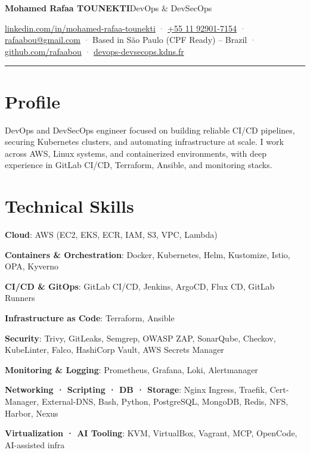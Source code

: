 \documentclass[10pt,a4paper]{article}
\begin{document}
{\LARGE\bfseries Mohamed Rafaa TOUNEKTI}\hfill{\small DevOps \& DevSecOps}\par
\vspace{3pt}
{\footnotesize \href{https://linkedin.com/in/mohamed-rafaa-tounekti}{linkedin.com/in/mohamed-rafaa-tounekti} \textcolor{graytext}{·} \href{tel:+5511929017154}{+55 11 92901-7154} \textcolor{graytext}{·} \href{mailto:rafaabou@gmail.com}{rafaabou@gmail.com} \textcolor{graytext}{·} Based in São Paulo (CPF Ready) – Brazil \textcolor{graytext}{·} \href{https://github.com/rafaabou}{github.com/rafaabou} \textcolor{graytext}{·} \href{https://devops-devsecops.kdns.fr/}{devops-devsecops.kdns.fr}}\par
\vspace{2pt}\hrule\vspace{2pt}
\section*{Profile}
DevOps and DevSecOps engineer focused on building reliable CI/CD pipelines, securing Kubernetes clusters, and automating infrastructure at scale. I work across AWS, Linux systems, and containerized environments, with deep experience in GitLab CI/CD, Terraform, Ansible, and monitoring stacks.\par
\section*{Technical Skills}
\textbf{Cloud}: AWS (EC2, EKS, ECR, IAM, S3, VPC, Lambda)\par
\textbf{Containers \& Orchestration}: Docker, Kubernetes, Helm, Kustomize, Istio, OPA, Kyverno\par
\textbf{CI/CD \& GitOps}: GitLab CI/CD, Jenkins, ArgoCD, Flux CD, GitLab Runners\par
\textbf{Infrastructure as Code}: Terraform, Ansible\par
\textbf{Security}: Trivy, GitLeaks, Semgrep, OWASP ZAP, SonarQube, Checkov, KubeLinter, Falco, HashiCorp Vault, AWS Secrets Manager\par
\textbf{Monitoring \& Logging}: Prometheus, Grafana, Loki, Alertmanager\par
\textbf{Networking · Scripting · DB · Storage}: Nginx Ingress, Traefik, Cert-Manager, External-DNS, Bash, Python, PostgreSQL, MongoDB, Redis, NFS, Harbor, Nexus\par
\textbf{Virtualization · AI Tooling}: KVM, VirtualBox, Vagrant, MCP, OpenCode, AI-assisted infra\par
\end{document}
